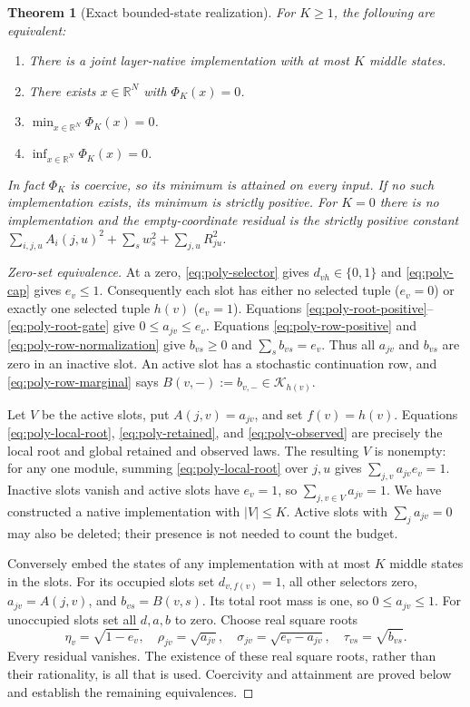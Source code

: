 \documentclass[11pt]{article}
\newtheorem{theorem}{Theorem}[section]
\theoremstyle{remark}
\begin{document}
\begin{theorem}[Exact bounded-state realization]
\label{thm:budget-zero}
For $K\ge1$, the following are equivalent:
\begin{enumerate}
\item There is a joint layer-native implementation with at most $K$ middle states.
\item There exists $x\in\mathbb R^N$ with $\Phi_K(x)=0$.
\item $\min_{x\in\mathbb R^N}\Phi_K(x)=0$.
\item $\inf_{x\in\mathbb R^N}\Phi_K(x)=0$.
\end{enumerate}
In fact $\Phi_K$ is coercive, so its minimum is attained on every input.
If no such implementation exists, its minimum is strictly positive.
For $K=0$ there is no implementation and the empty-coordinate residual is
the strictly positive constant
$\sum_{i,j,u}A_i(j,u)^2+\sum_sw_s^2+\sum_{j,u}R_{ju}^2$.
\end{theorem}

\begin{proof}[Zero-set equivalence]
At a zero, \eqref{eq:poly-selector} gives $d_{vh}\in\{0,1\}$ and
\eqref{eq:poly-cap} gives $e_v\le1$. Consequently each slot has either no
selected tuple ($e_v=0$) or exactly one selected tuple $h(v)$ ($e_v=1$).
Equations \eqref{eq:poly-root-positive}--\eqref{eq:poly-root-gate} give
$0\le a_{jv}\le e_v$. Equations \eqref{eq:poly-row-positive} and
\eqref{eq:poly-row-normalization} give $b_{vs}\ge0$ and
$\sum_sb_{vs}=e_v$. Thus all $a_{jv}$ and $b_{vs}$ are zero in an inactive
slot. An active slot has a stochastic continuation row, and
\eqref{eq:poly-row-marginal} says
$B(v,-):=b_{v,-}\in\mathcal K_{h(v)}$.

Let $V$ be the active slots, put $A(j,v)=a_{jv}$, and set $f(v)=h(v)$.
Equations \eqref{eq:poly-local-root}, \eqref{eq:poly-retained}, and
\eqref{eq:poly-observed} are precisely the local root and global retained
and observed laws. The resulting $V$ is nonempty: for any one module,
summing \eqref{eq:poly-local-root} over $j,u$ gives
$\sum_{j,v}a_{jv}e_v=1$. Inactive slots vanish and active slots have $e_v=1$,
so $\sum_{j,v\in V}a_{jv}=1$. We have constructed a native implementation
with $|V|\le K$. Active slots with $\sum_ja_{jv}=0$ may also be deleted;
their presence is not needed to count the budget.

Conversely embed the states of any implementation with at most $K$ middle
states in the slots. For its occupied slots set $d_{v,f(v)}=1$, all other
selectors zero, $a_{jv}=A(j,v)$, and $b_{vs}=B(v,s)$. Its total root mass is
one, so $0\le a_{jv}\le1$. For unoccupied slots set all $d,a,b$ to zero.
Choose real square roots
\[
 \eta_v=\sqrt{1-e_v},\quad
 \rho_{jv}=\sqrt{a_{jv}},\quad
 \sigma_{jv}=\sqrt{e_v-a_{jv}},\quad
 \tau_{vs}=\sqrt{b_{vs}}.
\]
Every residual vanishes. The existence of these real square roots, rather
than their rationality, is all that is used. Coercivity and attainment are
proved below and establish the remaining equivalences.
\end{proof}
\end{document}
